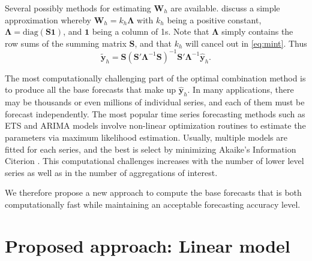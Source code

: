\documentclass[11pt,a4paper,]{article}
\begin{document}
Several possibly methods for estimating \(\bm{W}_h\) are available.
\textcite{mint2018} discuss a simple approximation whereby
\(\bm{W}_h = k_h \bm{\Lambda}\) with \(k_h\) being a positive constant,
\(\bm{\Lambda} = \text{diag}(\bm{S}\bm{1})\), and \(\bm{1}\) being a
column of 1s. Note that \(\bm{\Lambda}\) simply contains the row sums of
the summing matrix \(\bm{S}\), and that \(k_h\) will cancel out in
\eqref{eq:mint}. Thus \begin{equation}\label{eq:mint2}
  \tilde{\bm{y}}_{h}=\bm{S}(\bm{S}'\bm{\Lambda}^{-1}\bm{S})^{-1}\bm{S}'\bm{\Lambda}^{-1}\hat{\bm{y}}_h.
\end{equation}

The most computationally challenging part of the optimal combination
method is to produce all the base forecasts that make up
\(\hat{\bm{y}}_h\). In many applications, there may be thousands or even
millions of individual series, and each of them must be forecast
independently. The most popular time series forecasting methods such as
ETS and ARIMA models \autocite{fpp2} involve non-linear optimization
routines to estimate the parameters via maximum likelihood estimation.
Usually, multiple models are fitted for each series, and the best is
select by minimizing Akaike's Information Citerion
\autocite{akaike1998information}. This computational challenges
increases with the number of lower level series as well as in the number
of aggregations of interest.

We therefore propose a new approach to compute the base forecasts that
is both computationally fast while maintaining an acceptable forecasting
accuracy level.

\hypertarget{proposed-approach-linear-model}{%
\section{\texorpdfstring{Proposed approach: Linear model
\label{sec:proposedapproach1}}{Proposed approach: Linear model }}\label{proposed-approach-linear-model}}
\end{document}

